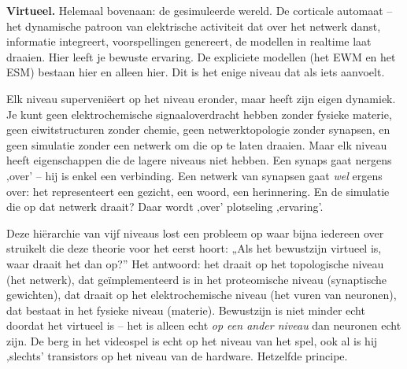 \documentclass[11pt, twoside, openright]{book}
\begin{document}
\textbf{Virtueel.} Helemaal bovenaan: de gesimuleerde wereld. De corticale automaat -- het dynamische patroon van elektrische activiteit dat over het netwerk danst, informatie integreert, voorspellingen genereert, de modellen in realtime laat draaien. Hier leeft je bewuste ervaring. De expliciete modellen (het EWM en het ESM) bestaan hier en alleen hier. Dit is het enige niveau dat als iets aanvoelt.

Elk niveau superveniëert op het niveau eronder, maar heeft zijn eigen dynamiek. Je kunt geen elektrochemische signaaloverdracht hebben zonder fysieke materie, geen eiwitstructuren zonder chemie, geen netwerktopologie zonder synapsen, en geen simulatie zonder een netwerk om die op te laten draaien. Maar elk niveau heeft eigenschappen die de lagere niveaus niet hebben. Een synaps gaat nergens ‚over' -- hij is enkel een verbinding. Een netwerk van synapsen gaat \textit{wel} ergens over: het representeert een gezicht, een woord, een herinnering. En de simulatie die op dat netwerk draait? Daar wordt ‚over' plotseling ‚ervaring'.

Deze hiërarchie van vijf niveaus lost een probleem op waar bijna iedereen over struikelt die deze theorie voor het eerst hoort: „Als het bewustzijn virtueel is, waar draait het dan op?” Het antwoord: het draait op het topologische niveau (het netwerk), dat geïmplementeerd is in het proteomische niveau (synaptische gewichten), dat draait op het elektrochemische niveau (het vuren van neuronen), dat bestaat in het fysieke niveau (materie). Bewustzijn is niet minder echt doordat het virtueel is -- het is alleen echt \textit{op een ander niveau} dan neuronen echt zijn. De berg in het videospel is echt op het niveau van het spel, ook al is hij ‚slechts' transistors op het niveau van de hardware. Hetzelfde principe.
\end{document}
